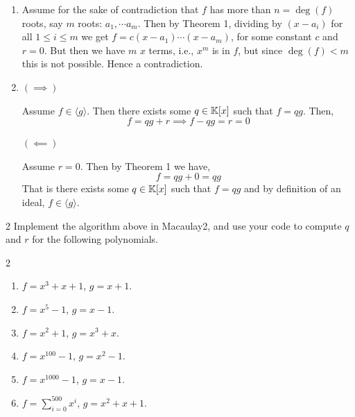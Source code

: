 \documentclass[Notebook.tex]{subfiles}
\begin{document}
\begin{solution}
    \bbni 

    \begin{enumerate}[label=(\alph*),ref=\theenumi\alph*]
        \item Assume for the sake of contradiction that $f$ has more than $n = \deg (f)$ roots, say $m$ roots: $a_1, \cdots a_m$. Then by Theorem 1, dividing by $(x-a_i)$ for all $ 1 \leq i \leq m$ we get $f = c(x- a_1) \cdots (x-a_m)$, for some constant $c$ and $r =0$. But then we have $m$ $x$ terms, i.e., $x^m$ is in $f$, but since $\deg(f) < m$ this is not possible. Hence a contradiction. 
        
        \item $(\implies)$ 
        
        Assume $f \in \langle g \rangle$. Then there exists some $q \in \mathbb K[x]$ such that $f = qg$. Then, 
        \[f = qg + r \implies f - qg = r = 0\]

        $(\impliedby)$ 

        Assume $r = 0$. Then by Theorem 1 we have, 
        \[f = qg + 0 = qg\]
        That is there exists some $q \in \mathbb K[x]$ such that $f = qg$ and by definition of an ideal, $f \in \langle g \rangle$. 
    \end{enumerate}
\end{solution}

\newpage 

\begin{problem}{2}
Implement the algorithm above in Macaulay2, and use your code to compute $q$ and $r$ for the following polynomials.
\begin{multicols}{2}
    \begin{enumerate}[label=(\alph*),ref=\theenumi\alph*]
        \item $f = x^3 + x + 1$, \quad $g = x + 1$.
        \item $f = x^5 - 1$, \quad $g = x - 1$.
        \item $f = x^2 + 1$, \quad $g = x^3 + x$.
        \item $f = x^{100} - 1$, \quad $g = x^2 - 1$.
        \item $f = x^{1000} - 1$, \quad $g = x - 1$.
        \item $f = \sum_{i=0}^{500} x^i$, \quad $g = x^2 + x + 1$.
    \end{enumerate}
\end{multicols}
\end{problem}
\end{document}
